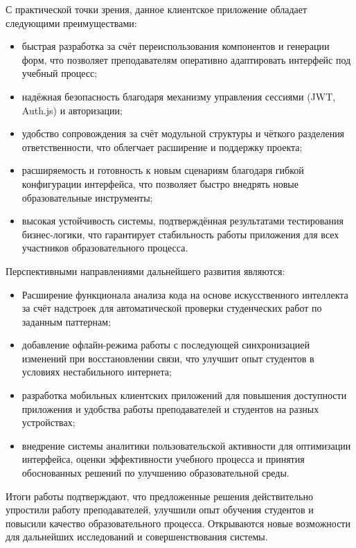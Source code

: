 С практической точки зрения, данное клиентское приложение обладает следующими преимуществами:
\begin{itemize}
  \item быстрая разработка за счёт переиспользования компонентов и генерации форм, что позволяет преподавателям оперативно адаптировать интерфейс под учебный процесс;
  \item надёжная безопасность благодаря механизму управления сессиями (JWT, Auth.js) и авторизации;
  \item удобство сопровождения за счёт модульной структуры и чёткого разделения ответственности, что облегчает расширение и поддержку проекта;
  \item расширяемость и готовность к новым сценариям благодаря гибкой конфигурации интерфейса, что позволяет быстро внедрять новые образовательные инструменты;
  \item высокая устойчивость системы, подтверждённая результатами тестирования бизнес-логики, что гарантирует стабильность работы приложения для всех участников образовательного процесса.
\end{itemize}

Перспективными направлениями дальнейшего развития являются:
\begin{itemize}
  \item Расширение функционала анализа кода на основе искусственного интеллекта за счёт надстроек для автоматической проверки студенческих работ по заданным паттернам;
  \item добавление офлайн-режима работы с последующей синхронизацией изменений при восстановлении связи, что улучшит опыт студентов в условиях нестабильного интернета;
  \item разработка мобильных клиентских приложений для повышения доступности приложения и удобства работы преподавателей и студентов на разных устройствах;
  \item внедрение системы аналитики пользовательской активности для оптимизации интерфейса, оценки эффективности учебного процесса и принятия обоснованных решений по улучшению образовательной среды.
\end{itemize}

Итоги работы подтверждают, что предложенные решения действительно упростили работу преподавателей, улучшили опыт обучения студентов и повысили качество образовательного процесса. Открываются новые возможности для дальнейших исследований и совершенствования системы.
